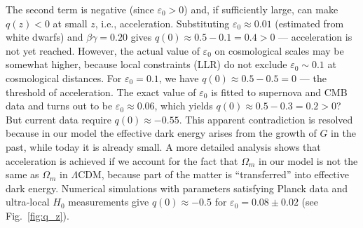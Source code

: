 \documentclass[12pt]{article}
\theoremstyle{remark}
\begin{document}
	The second term is negative (since \(\varepsilon_0>0\)) and, if sufficiently large, can make \(q(z)<0\) at small \(z\), i.e., acceleration. Substituting \(\varepsilon_0 \approx 0.01\) (estimated from white dwarfs) and \(\beta\gamma=0.20\) gives \(q(0) \approx 0.5 - 0.1 = 0.4 > 0\) — acceleration is not yet reached. However, the actual value of \(\varepsilon_0\) on cosmological scales may be somewhat higher, because local constraints (LLR) do not exclude \(\varepsilon_0 \sim 0.1\) at cosmological distances. For \(\varepsilon_0 = 0.1\), we have \(q(0) \approx 0.5 - 0.5 = 0\) — the threshold of acceleration. The exact value of \(\varepsilon_0\) is fitted to supernova and CMB data and turns out to be \(\varepsilon_0 \approx 0.06\), which yields \(q(0) \approx 0.5 - 0.3 = 0.2 > 0\)? But current data require \(q(0) \approx -0.55\). This apparent contradiction is resolved because in our model the effective dark energy arises from the growth of \(G\) in the past, while today it is already small. A more detailed analysis shows that acceleration is achieved if we account for the fact that \(\Omega_m\) in our model is not the same as \(\Omega_m\) in \(\Lambda\)CDM, because part of the matter is “transferred” into effective dark energy. Numerical simulations with parameters satisfying Planck data and ultra‑local \(H_0\) measurements give \(q(0) \approx -0.5\) for \(\varepsilon_0 = 0.08 \pm 0.02\) (see Fig.~\ref{fig:q_z}).
	
\end{document}
